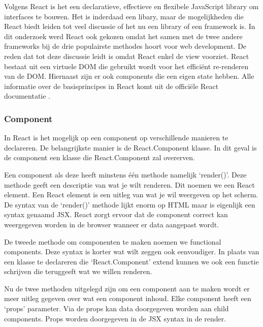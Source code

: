 Volgens React is het een declaratieve, effectieve en flexibele JavaScript library om interfaces te bouwen. Het is inderdaad een libary, maar de mogelijkheden die React biedt leiden tot veel discussie of het nu een library of een framework is. In dit onderzoek werd React ook gekozen omdat het samen met de twee andere frameworks bij de drie populairste methodes hoort voor web development. De reden dat tot deze discussie leidt is omdat React enkel de view voorziet. React bestaat uit een virtuele DOM die gebruikt wordt voor het efficiënt re-renderen van de DOM. Hiernaast zijn er ook components die een eigen state hebben.
Alle informatie over de basisprincipes in React komt uit de officiële React documentatie \autocite{_react_2018}.

\subsubsection{Component}
\label{sec:React_Component}
In React is het mogelijk op een component op verschillende manieren te declareren. De belangrijkste manier is de React.Component klasse. In dit geval is de component een klasse die React.Component zal overerven.


Een component als deze heeft minstens één methode namelijk ‘render()’. Deze methode geeft een descriptie van wat je wilt renderen. Dit noemen we een React element. Een React element is een uitleg van wat je wil weergeven op het scherm. De syntax van de ‘render()’ methode lijkt enorm op HTML maar is eigenlijk een syntax genaamd JSX. React zorgt ervoor dat de component correct kan weergegeven worden in de browser wanneer er data aangepast wordt.

De tweede methode om componenten te maken noemen we functional components. Deze syntax is korter wat wilt zeggen ook eenvoudiger. In plaats van een klasse te declareren die ‘React.Component’ extend kunnen we ook een functie schrijven die teruggeeft wat we willen renderen.


Nu de twee methoden uitgelegd zijn om een component aan te maken wordt er meer uitleg gegeven over wat een component inhoud. Elke component heeft een ‘props’ parameter. Via de props kan data doorgegeven worden aan child components. Props worden doorgegeven in de JSX syntax in de render.

